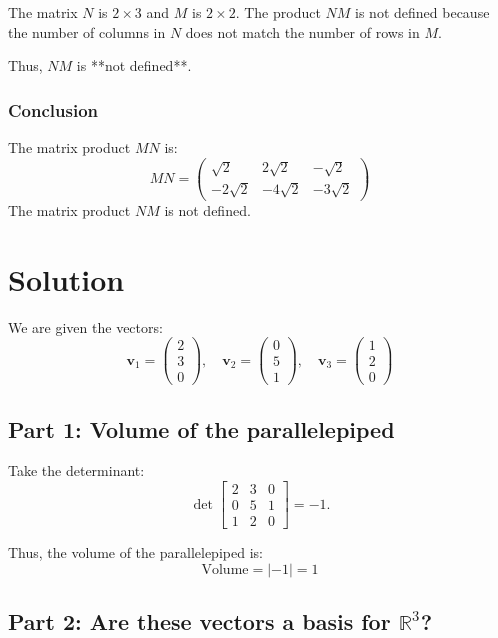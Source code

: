 \documentclass[11pt]{article}
\begin{document}
The matrix \( N \) is \( 2 \times 3 \) and \( M \) is \( 2 \times 2 \). The product \( NM \) is not defined because the number of columns in \( N \) does not match the number of rows in \( M \).

Thus, \( NM \) is **not defined**.

\subsubsection*{Conclusion}

The matrix product \( MN \) is:
\[
MN = \begin{pmatrix}
\sqrt{2} & 2\sqrt{2} & -\sqrt{2} \\
-2\sqrt{2} & -4\sqrt{2} & -3\sqrt{2}
\end{pmatrix}
\]
The matrix product \( NM \) is not defined.

\newpage

\section{Solution}

We are given the vectors:
\[
\mathbf{v}_1 = \begin{pmatrix} 2 \\ 3 \\ 0 \end{pmatrix}, \quad \mathbf{v}_2 = \begin{pmatrix} 0 \\ 5 \\ 1 \end{pmatrix}, \quad \mathbf{v}_3 = \begin{pmatrix} 1 \\ 2 \\ 0 \end{pmatrix}
\]

\subsection{Part 1: Volume of the parallelepiped}
Take the determinant:
\[
  \det \begin{bmatrix} 2 & 3 & 0 \\ 0 & 5 & 1 \\ 1 & 2 & 0 \end{bmatrix} = -1.
\]

Thus, the volume of the parallelepiped is:
\[
\text{Volume} = | -1 | = 1
\]

\newpage

\subsection{Part 2: Are these vectors a basis for \( \mathbb{R}^3 \)?}
\end{document}
